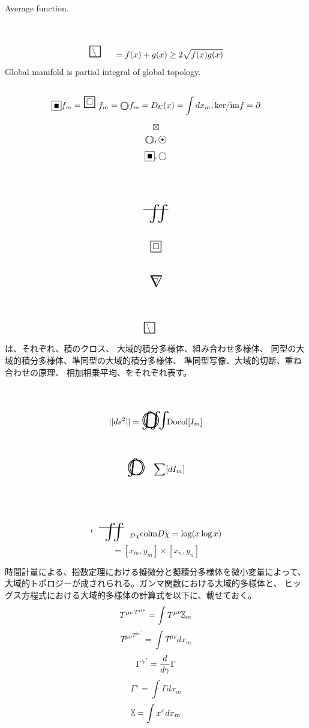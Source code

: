 \documentclass{jsarticle}
\begin{document}
  Average function.
  $$ \average = {{f(x) + g(x)}} \ge 2{\sqrt{f(x)g(x)}} $$
  Global manifold is partial integral of global topology.
 $$ \whitewithblacksquare f_m =  \whitewithboder \text{                 
      } f_m = 
 \whitewithbodercircle f_m = 
  D_{\mathcal{K}}(x) = \int dx_m , \mathrm{ker}/\mathrm{im}f = 
  \partial $$

$$\boxtimes$$
$$\whitewithbodercircle, \whitewithblack $$
$$\whitewithblacksquare,\whitewithwhitecircle$$
$$\scalebox{2.0}[2]{\variint}$$ 
$$\whitewithboder$$ 
$$ \whitewithnabla$$
$$\average$$ 
は、それぞれ、積のクロス、 大域的積分多様体、組み合わせ多様体、
同型の大域的積分多様体、準同型の大域的積分多様体、
準同型写像、大域的切断、重ね合わせの原理、
相加相乗平均、をそれぞれ表す。
 

$$||ds^2||=\whitewithbodercircleiiint \mathrm{Docol}[I_m]$$
$$  \whitewithbodercircleint \sum[dI_m]$$

$$ {}^t\scalebox{2.0}[2]{\variint}_{D\chi}\mathrm{colm}D\chi = \log(x\log x)$$
$$ = [x_m,y_m]\times [x_n,y_n] $$

\newcommand{\timebow}{%
	\begin{picture}(5,5)
		\put(0,0){$\text{\rotatebox{90}{$\bowtie$}}$}
	\end{picture} %
	}


 \newcommand{\alearletter}{%
	 \begin{picture}(10,20)
		 \put(0,0){
			 $ \square $}
		 \put(0,0){\line(1,1){10}}
	 \end{picture} %
	 }
 \newcommand{\flowerletter}{%
	 \begin{picture}(10,20)
		 \put(0,0){$\text{\scalebox{1.0}[1]{$\square$}}$}
		 \put(0,0){$\text{\scalebox{1.0}[2]{$\int$}}$}
	 \end{picture} %
	 }



       時間計量による、指数定理における擬微分と擬積分多様体を微小変量によって、
   大域的トポロジーが成されられる。ガンマ関数における大域的多様体と、
   ヒッグス方程式における大域的多様体の計算式を以下に、載せておく。
   $$ {T^{\mu\nu}}^{T^{\mu\nu}} = \int T^{\mu\nu} \rotatebox{90}{$\bowtie$}_m $$
   $$   {T^{\mu\nu}}^{{T^{\mu\nu}}^{'}}=\int T^{\mu\nu}dx_m  $$
      $$ {\Gamma^{\gamma}}^{'} = {d \over {d \gamma}}\Gamma $$
   $$ \Gamma^{\gamma} = \int \Gamma dx_m $$
   $$ \rotatebox{90}{$\bowtie$} = \int x^x dx_m $$
\end{document}
